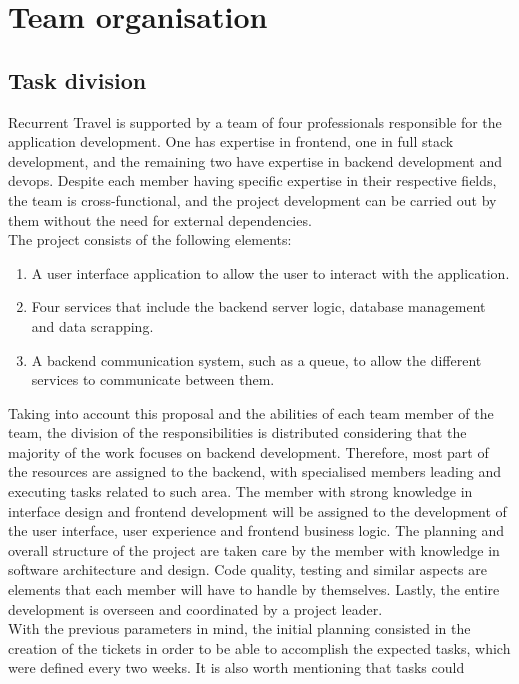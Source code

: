 \documentclass[../memory.tex]{subfiles}
\begin{document}
\chapter{Team organisation}
\section{Task division}
Recurrent Travel is supported by a team of four professionals responsible for
the application development. One has expertise in frontend, one in full stack
development, and the remaining two have expertise in backend development and
devops. Despite each member having specific expertise in their respective
fields, the team is cross-functional, and the project development can be carried
out by them without the need for external dependencies.
\\
The project consists of the following elements:
\begin{enumerate}[label = -]
	\item A user interface application to allow the user to interact with the
	      application.
	\item Four services that include the backend server logic, database management
	      and data scrapping.
	\item A backend communication system, such as a queue, to allow the different
	      services to communicate between them.
\end{enumerate}
Taking into account this proposal and the abilities of each team member of the
team, the division of the responsibilities is distributed considering that the
majority of the work focuses on backend development. Therefore, most part of the
resources are assigned to the backend, with specialised members leading and
executing tasks related to such area. The member with strong knowledge in
interface design and frontend development will be assigned to the development of
the user interface, user experience and frontend business logic. The planning
and overall structure of the project are taken care by the member with knowledge
in software architecture and design. Code quality, testing and similar aspects
are elements that each member will have to handle by themselves. Lastly, the
entire development is overseen and coordinated by a project leader.
\\[8pt]
With the previous parameters in mind, the initial planning consisted in the
creation of the tickets in order to be able to accomplish the expected tasks,
which were defined every two weeks. It is also worth mentioning that tasks could
\end{document}
